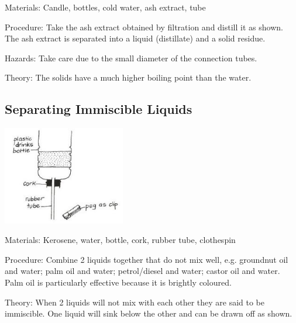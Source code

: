 \begin{multicols}{2}
\begin{description*}
\item[Materials:]{Candle, bottles, cold water, ash extract, tube}
\item[Procedure:]{Take the ash extract obtained by filtration and distill it as shown. The
ash extract is separated into a liquid (distillate)
and a solid residue.}
\item[Hazards:]{Take care due to the small diameter of the
connection tubes.}
\item[Theory:]{The solids have a much higher boiling point
than the water.}
\end{description*}

\subsection{Separating Immiscible Liquids} %

\begin{center}
\includegraphics[width=0.4\textwidth]{./img/vso/sep-immiscible.jpg}
\end{center}

\begin{description*}
\item[Materials:]{Kerosene, water, bottle, cork, rubber tube, clothespin}
\item[Procedure:]{Combine 2 liquids together that do not mix well, e.g. groundnut oil and water; palm oil
and water; petrol/diesel and
water; castor oil and water. Palm
oil is particularly effective because
it is brightly coloured.}
\item[Theory:]{When 2 liquids will not mix with
each other they are said to be
immiscible. One liquid will sink
below the other and can be
drawn off as shown.}
\end{description*}


\end{multicols}
